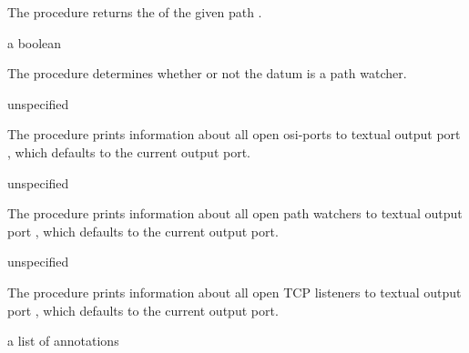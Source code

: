 The  procedure returns the  of the
given path .

\begin{procedure}
\end{procedure}
\returns{} a boolean

The  procedure determines whether or not the datum
 is a path watcher.

\begin{procedure}
\end{procedure}
\returns{} unspecified

The  procedure prints information about all open
osi-ports to textual output port , which defaults to the
current output port.

\begin{procedure}
\end{procedure}
\returns{} unspecified

The  procedure prints information about all
open path watchers to textual output port
, which defaults to the current output port.

\begin{procedure}
\end{procedure}
\returns{} unspecified

The  procedure prints information about all
open TCP listeners to textual output port
, which defaults to the current output port.

\begin{procedure}
\end{procedure}
\returns{} a list of annotations

